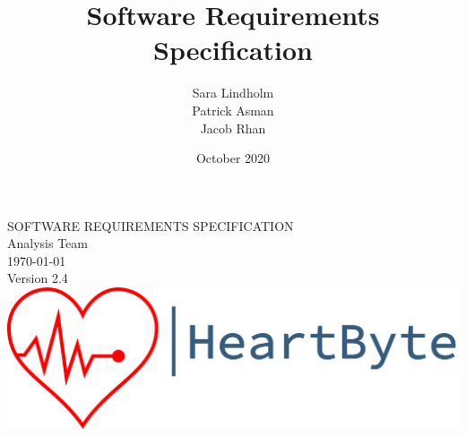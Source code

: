 \documentclass{scrreprt}
\title{Software Requirements Specification}
\author{Sara Lindholm \\ Patrick Asman \\ Jacob Rhan}
\date{October 2020}
\def\myversion{2.4}
\begin{document}
\begin{titlepage}
    \begin{center}
    \begin{bfseries}
        \Huge{SOFTWARE REQUIREMENTS SPECIFICATION}\\
        \vspace{1.5cm}
        \LARGE Analysis Team \\
        \vspace{1.5cm}
        \today\\
        \vspace{1.5cm}
        {Version \myversion}\\
        \vfill
        \includegraphics[width=\linewidth]{Pictures/logo.png} \\
    \end{bfseries}
    \end{center}
\end{titlepage}
\end{document}
